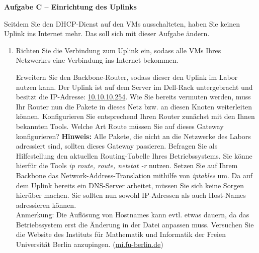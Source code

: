 \documentclass[paper=a4,fontsize=11pt]{scrartcl}%
\numberwithin{equation}{section}
\begin{document}
\begin{center}\Large{\textbf{Aufgabe C -- Einrichtung des Uplinks}}\end{center}\vskip0.25in
Seitdem Sie den DHCP-Dienst auf den VMs ausschalteten, haben Sie keinen Uplink ins Internet mehr. Das soll sich mit dieser Aufgabe ändern.
\begin{enumerate}
	\item Richten Sie die Verbindung zum Uplink ein, sodass alle VMs Ihres Netzwerkes eine Verbindung ins Internet bekommen.
	\begin{tasks}
		\task Erweitern Sie den Backbone-Router, sodass dieser den Uplink im Labor nutzen kann. Der Uplink ist auf dem Server im Dell-Rack untergebracht und besitzt die IP-Adresse: \url{10.10.10.254}. Wie Sie bereits vermuten werden, muss Ihr Router nun die Pakete in dieses Netz bzw. an diesen Knoten weiterleiten können. Konfigurieren Sie entsprechend Ihren Router zunächst mit den Ihnen bekannten Tools.
		\task Welche Art Route müssen Sie auf dieses Gateway konfigurieren? \textbf{Hinweis:} Alle Pakete, die nicht an die Netzwerke des Labors adressiert sind, sollten dieses Gateway passieren.
  		\task Befragen Sie als Hilfestellung den aktuellen Routing-Tabelle Ihres Betriebssystems. Sie könne hierfür die Tools \emph{ip route, route, netstat -r} nutzen.
  		\task Setzen Sie auf Ihrem Backbone das Network-Address-Translation mithilfe von \emph{iptables} um.
 		\task Da auf dem Uplink bereits ein DNS-Server arbeitet, müssen Sie sich keine Sorgen hierüber machen. Sie sollten nun sowohl IP-Adressen als auch Host-Names adressieren können.\\
 		Anmerkung: Die Auflösung von Hostnames kann evtl. etwas dauern, da das Betriebssystem erst die Änderung in der Datei  anpassen muss.
 		\task Versuchen Sie die Website des Instituts für Mathematik und Informatik der Freien Universität Berlin anzupingen.
 		(\url{mi.fu-berlin.de})
\end{tasks}
\end{enumerate}
\end{document}
